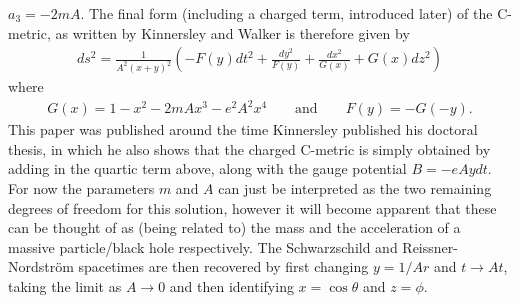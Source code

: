 \documentclass[
twoside,
openright,
frontopenright
]{dmathesis}
\begin{document}
$a_3 = -2 m A$. The final form (including a charged term, introduced later) of
the C-metric, as written by Kinnersley and Walker is therefore given by
\begin{align}
  \label{eq:kinnersley-walker-metric}
  ds^2 = \frac{1}{A^2(x+y)^2} \left(-F(y)dt^2 + \frac{dy^2}{F(y)} +
  \frac{dx^2}{G(x)} + G(x) dz^2\right)
\end{align}
where
\begin{align}
  G(x) = 1-x^2-2mAx^3-e^2 A^2 x^4\qquad \mbox{and} \qquad F(y) = -G(-y).
\end{align}
This paper was published around the time Kinnersley published his doctoral
thesis, in which he also shows that the charged C-metric is simply obtained by
adding in the quartic term above, along with the gauge potential $B = -eAydt$.
For now the parameters $m$ and $A$ can just be interpreted as the two remaining
degrees of freedom for this solution, however it will become apparent that these
can be thought of as (being related to) the mass and the acceleration of a
massive particle/black hole respectively. The Schwarzschild and
Reissner-Nordstr\"om spacetimes are then recovered by first changing $y = 1/Ar$
and $t\to At$, taking the limit as $A \to 0$ and then identifying
$x = \cos\theta$ and $z = \phi$.
\end{document}
